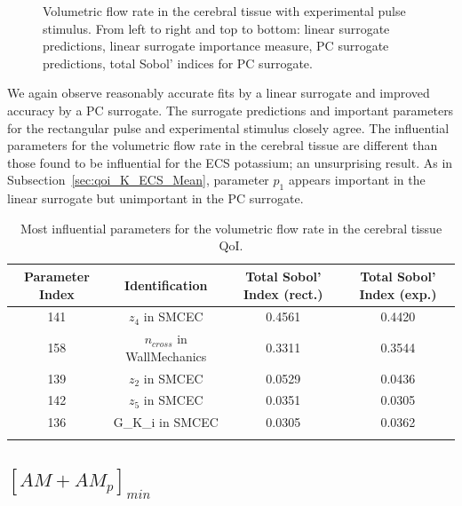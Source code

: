 \begin{figure}[h]
\caption{Volumetric flow rate in the cerebral tissue with experimental pulse stimulus. From left to right and top to bottom: linear surrogate predictions, linear surrogate importance measure, PC surrogate predictions, total Sobol' indices for PC surrogate.}
\label{fig:qoi_vol_flow_exp}
\end{figure}

We again observe reasonably accurate fits by a linear surrogate and improved accuracy by a PC surrogate. The surrogate predictions and important parameters for the rectangular pulse and experimental stimulus closely agree. The influential parameters for the volumetric flow rate in the cerebral tissue are different than those found to be influential for the ECS potassium; an unsurprising result. As in Subsection~\ref{sec:qoi_K_ECS_Mean}, parameter $p_1$ appears important in the linear surrogate but unimportant in the PC surrogate.

\begin{table}[h]
\centering
{}
\begin{tabular}{cccc}
\toprule
Parameter Index & Identification & Total Sobol' Index (rect.) & Total Sobol' Index (exp.)\\
\midrule
141 &  $z_4$ in SMCEC & 0.4561 & 0.4420\\
158 & $n_{cross}$ in WallMechanics & 0.3311 & 0.3544\\ 
 139 & $z_2$ in SMCEC & 0.0529 & 0.0436\\
 142 & $z_5$ in SMCEC &  0.0351 &0.0305\\
  136 & G\_K\_i in SMCEC & 0.0305 &0.0362\\
   \arrayrulecolor{black}\bottomrule
\end{tabular}
\caption{Most influential parameters for the volumetric flow rate in the cerebral tissue QoI.}
\label{tab:qoi_vol_flow}
\end{table}

\subsection{$[AM+AM_p]_{min}$}

